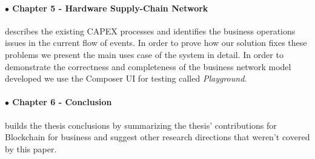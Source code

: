 \paragraph{$\bullet$ Chapter 5 - Hardware Supply-Chain Network} describes the existing CAPEX processes and identifies the business operations issues in the current flow of events. In order to prove how our solution fixes these problems we present the main uses case of the system in detail. In order to demonstrate the correctness and completeness of the business network model developed we use the Composer UI for testing called \emph{Playground}. 

\paragraph{$\bullet$ Chapter 6 - Conclusion} builds the thesis conclusions by summarizing the thesis' contributions for Blockchain for business and suggest other research directions that weren't covered by this paper.















